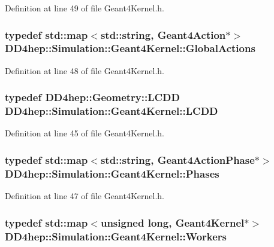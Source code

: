 Definition at line 49 of file Geant4Kernel.h.\hypertarget{class_d_d4hep_1_1_simulation_1_1_geant4_kernel_a9cd070dfd06f049aa11b56688faaa643}{
\subsubsection[{GlobalActions}]{\setlength{\rightskip}{0pt plus 5cm}typedef std::map$<$std::string, {\bf Geant4Action}$\ast$$>$ {\bf DD4hep::Simulation::Geant4Kernel::GlobalActions}}}
\label{class_d_d4hep_1_1_simulation_1_1_geant4_kernel_a9cd070dfd06f049aa11b56688faaa643}


Definition at line 48 of file Geant4Kernel.h.\hypertarget{class_d_d4hep_1_1_simulation_1_1_geant4_kernel_a190e652b62ebce3db3372c4265ffa5a3}{
\subsubsection[{LCDD}]{\setlength{\rightskip}{0pt plus 5cm}typedef {\bf DD4hep::Geometry::LCDD} {\bf DD4hep::Simulation::Geant4Kernel::LCDD}}}
\label{class_d_d4hep_1_1_simulation_1_1_geant4_kernel_a190e652b62ebce3db3372c4265ffa5a3}


Definition at line 45 of file Geant4Kernel.h.\hypertarget{class_d_d4hep_1_1_simulation_1_1_geant4_kernel_ae28985781d4226ece4c3fffe8827b400}{
\subsubsection[{Phases}]{\setlength{\rightskip}{0pt plus 5cm}typedef std::map$<$std::string, {\bf Geant4ActionPhase}$\ast$$>$ {\bf DD4hep::Simulation::Geant4Kernel::Phases}}}
\label{class_d_d4hep_1_1_simulation_1_1_geant4_kernel_ae28985781d4226ece4c3fffe8827b400}


Definition at line 47 of file Geant4Kernel.h.\hypertarget{class_d_d4hep_1_1_simulation_1_1_geant4_kernel_ae9fdf26cda88a6f822f060558e85d797}{
\subsubsection[{Workers}]{\setlength{\rightskip}{0pt plus 5cm}typedef std::map$<$unsigned long, {\bf Geant4Kernel}$\ast$$>$ {\bf DD4hep::Simulation::Geant4Kernel::Workers}}}
\label{class_d_d4hep_1_1_simulation_1_1_geant4_kernel_ae9fdf26cda88a6f822f060558e85d797}


